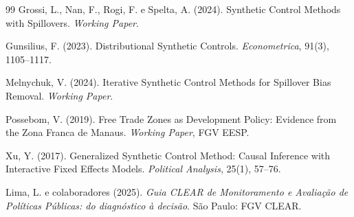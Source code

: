\documentclass[12pt, a4paper, openany]{book}
\begin{document}
\begin{thebibliography}{99}
Grossi, L., Nan, F., Rogi, F. e Spelta, A. (2024).
\newblock Synthetic Control Methods with Spillovers.
\newblock \textit{Working Paper}.

Gunsilius, F. (2023).
\newblock Distributional Synthetic Controls.
\newblock \textit{Econometrica}, 91(3), 1105--1117.

Melnychuk, V. (2024).
\newblock Iterative Synthetic Control Methods for Spillover Bias Removal.
\newblock \textit{Working Paper}.

Possebom, V. (2019).
\newblock Free Trade Zones as Development Policy: Evidence from the Zona Franca de Manaus.
\newblock \textit{Working Paper}, FGV EESP.

Xu, Y. (2017).
\newblock Generalized Synthetic Control Method: Causal Inference with Interactive Fixed Effects Models.
\newblock \textit{Political Analysis}, 25(1), 57--76.

Lima, L. e colaboradores (2025). \textit{Guia CLEAR de Monitoramento e Avaliação de Políticas Públicas: do diagnóstico à decisão}. São Paulo: FGV CLEAR.

\end{thebibliography}
\end{document}
